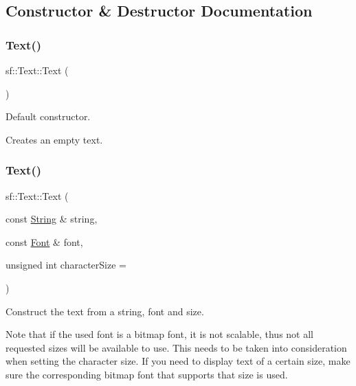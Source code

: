 \subsection{Constructor \& Destructor Documentation}
\mbox{\label{classsf_1_1_text_aff7cab6a92e5948c9d1481cb2d87eb84}} 
\subsubsection{\texorpdfstring{Text()}{Text()}\hspace{0.1cm}{\footnotesize\ttfamily [1/2]}}
{\footnotesize\ttfamily sf\+::\+Text\+::\+Text (\begin{DoxyParamCaption}{ }\end{DoxyParamCaption})}



Default constructor. 

Creates an empty text. \begin{DoxyVerb}\end{DoxyVerb}
 \mbox{\label{classsf_1_1_text_a614019e0b5c0ed39a99d32483a51f2c5}} 
\subsubsection{\texorpdfstring{Text()}{Text()}\hspace{0.1cm}{\footnotesize\ttfamily [2/2]}}
{\footnotesize\ttfamily sf\+::\+Text\+::\+Text (\begin{DoxyParamCaption}\item[{const \mbox{\hyperlink{classsf_1_1_string}{String}} \&}]{string,  }\item[{const \mbox{\hyperlink{classsf_1_1_font}{Font}} \&}]{font,  }\item[{unsigned int}]{character\+Size = {} }\end{DoxyParamCaption})}



Construct the text from a string, font and size. 

Note that if the used font is a bitmap font, it is not scalable, thus not all requested sizes will be available to use. This needs to be taken into consideration when setting the character size. If you need to display text of a certain size, make sure the corresponding bitmap font that supports that size is used.


